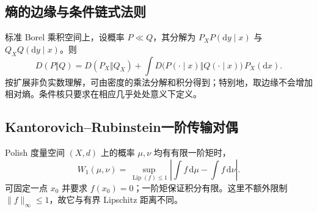 \documentclass[../main.tex]{subfiles}
\begin{document}
\subsection{熵的边缘与条件链式法则}
标准 Borel 乘积空间上，设概率 $P\ll Q$，其分解为 $P_XP(\mathrm dy\mid x)$ 与 $Q_XQ(\mathrm dy\mid x)$。则
\[
D(P\Vert Q)=D(P_X\Vert Q_X)
+\int D\bigl(P(\cdot\mid x)\Vert Q(\cdot\mid x)\bigr)\,P_X(\mathrm dx).
\]
按扩展非负实数理解，可由密度的乘法分解和积分得到；特别地，取边缘不会增加相对熵。条件核只要求在相应几乎处处意义下定义。
\subsection{Kantorovich--Rubinstein一阶传输对偶}
Polish 度量空间 $(X,d)$ 上的概率 $\mu,\nu$ 均有有限一阶矩时，
\[
W_1(\mu,\nu)=\sup_{\operatorname{Lip}(f)\le1}
\left|\int f\,\mathrm d\mu-\int f\,\mathrm d\nu\right|.
\]
可固定一点 $x_0$ 并要求 $f(x_0)=0$；一阶矩保证积分有限。这里不额外限制 $\|f\|_\infty\le1$，故它与有界 Lipschitz 距离不同。
\clearpage
\end{document}
